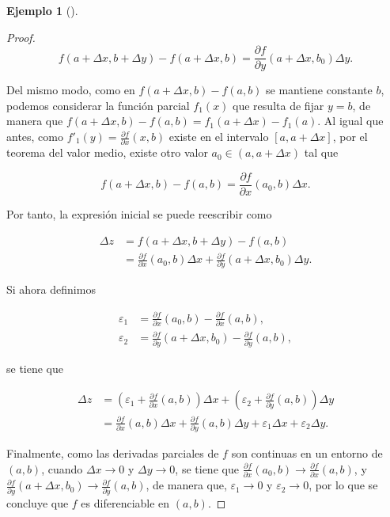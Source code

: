 \documentclass[
  a4paper,
]{scrreport}
\theoremstyle{definition}
\newtheorem{example}{Ejemplo}[chapter]
\theoremstyle{plain}
\theoremstyle{definition}
\theoremstyle{definition}
\theoremstyle{plain}
\theoremstyle{plain}
\theoremstyle{remark}
\begin{document}
\begin{example}[]
\begin{tcolorbox}
\begin{proof}
\[
f(a+\Delta x, b+\Delta y) - f(a+\Delta x, b) = \frac{\partial f}{\partial y}(a+\Delta x, b_0) \Delta y.
\]

Del mismo modo, como en \(f(a+\Delta x, b) - f(a,b)\) se mantiene
constante \(b\), podemos considerar la función parcial \(f_1(x)\) que
resulta de fijar \(y=b\), de manera que
\(f(a+\Delta x, b) - f(a,b)=f_1(a+\Delta x)-f_1(a)\). Al igual que
antes, como \(f'_1(y)=\frac{\partial f}{\partial x}(x, b)\) existe en el
intervalo \([a, a+\Delta x]\), por el teorema del valor medio, existe
otro valor \(a_0\in(a, a+\Delta x)\) tal que

\[
f(a+\Delta x, b) - f(a,b) = \frac{\partial f}{\partial x}(a_0, b) \Delta x.
\]

Por tanto, la expresión inicial se puede reescribir como

\begin{align*}
\Delta z 
&= f(a+\Delta x, b+\Delta y) - f(a,b) \\
&= \frac{\partial f}{\partial x}(a_0, b) \Delta x + \frac{\partial f}{\partial y}(a+\Delta x, b_0) \Delta y.
\end{align*}

Si ahora definimos

\begin{align*}
\varepsilon_1 &= \frac{\partial f}{\partial x}(a_0,b)-\frac{\partial f}{\partial x}(a,b),\\
\varepsilon_2 &= \frac{\partial f}{\partial y}(a+\Delta x, b_0)-\frac{\partial f}{\partial y}(a,b),
\end{align*}

se tiene que

\begin{align*}
\Delta z 
&=
\left(\varepsilon_1 + \frac{\partial f}{\partial x}(a, b)\right)\Delta x + \left(\varepsilon_2 + \frac{\partial f}{\partial y}(a, b)\right)\Delta y \\
&= \frac{\partial f}{\partial x}(a, b)\Delta x + \frac{\partial f}{\partial y}(a, b)\Delta y + \varepsilon_1\Delta x + \varepsilon_2\Delta y.
\end{align*}

Finalmente, como las derivadas parciales de \(f\) son continuas en un
entorno de \((a,b)\), cuando \(\Delta x\to 0\) y \(\Delta y\to 0\), se
tiene que
\(\frac{\partial f}{\partial x}(a_0,b)\to \frac{\partial f}{\partial x}(a,b)\),
y
\(\frac{\partial f}{\partial y}(a+\Delta x, b_0)\to \frac{\partial f}{\partial y}(a,b)\),
de manera que, \(\varepsilon_1\to 0\) y \(\varepsilon_2\to 0\), por lo
que se concluye que \(f\) es diferenciable en \((a,b)\).


\end{proof}
\end{tcolorbox}
\end{example}
\end{document}
